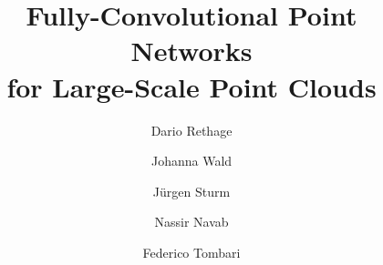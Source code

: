\documentclass[runningheads]{llncs}
\begin{document}
%
\title{Fully-Convolutional Point Networks\\for Large-Scale Point Clouds} 

%
\author{Dario Rethage \and
Johanna Wald \and
J\"urgen Sturm \and \break
Nassir Navab \and
Federico Tombari}
%
%
\end{document}
